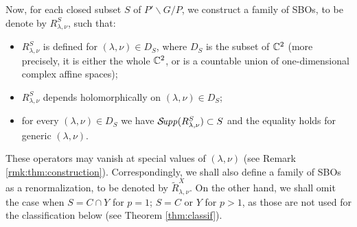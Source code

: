 \documentclass[reqno,12pt]{pja00} %
\newcommand{\Supp}{\mathcal{S}\!{\it upp}}
\theoremstyle{definition}
\theoremstyle{exampstyle} \newtheorem{examp}[theorem]{Theorem}
\begin{document}
Now, for each closed subset $S$ of $P'\backslash G/P$, we construct a family of SBOs, to be denote by $R^S_{\lambda,\nu}$, such that:
\begin{itemize}
	\item $R_{\lambda,\nu}^S$ is defined for $(\lambda,\nu)\in D_S$, where $D_S$ is the subset of $\mathbb{C}^2$ (more precisely, it is either the whole $\mathbb{C}^2$, or is a countable
		union of one-dimensional complex affine spaces);
	\item $R_{\lambda,\nu}^S$ depends holomorphically on $(\lambda,\nu)\in D_S$;
	\item for every $(\lambda,\nu)\in D_S$ we have $\Supp(R_{\lambda,\nu}^S)\subset S$ and the equality holds for generic $(\lambda,\nu)$.
\end{itemize}
These operators may vanish at special values of $(\lambda,\nu)$ (see Remark \ref{rmk:thm:construction}). Correspondingly, we shall also define
a family of SBOs as a renormalization, to be denoted by $\tilde{R}^X_{\lambda,\nu}$. On the other hand, we shall omit the case when $S=C\cap Y$ for $p=1$;
$S=C$ or $Y$ for $p>1$, as those are not used for the classification below (see Theorem \ref{thm:classif}).
\end{document}
